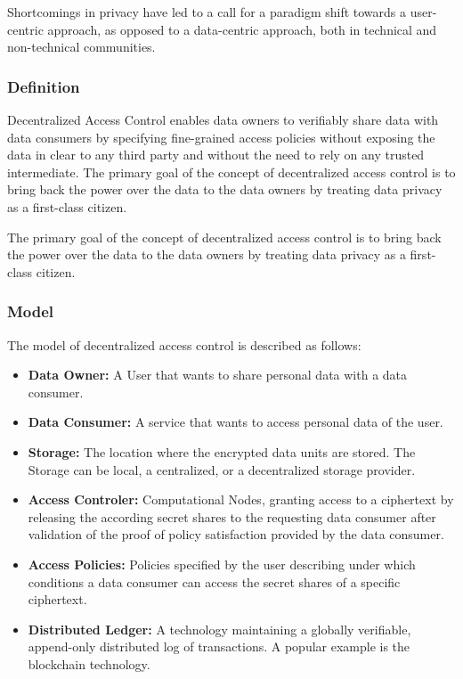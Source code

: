 \documentclass[conference]{IEEEtran}
\begin{document}
Shortcomings in privacy have led to a call for a paradigm shift towards a user-centric approach, as opposed to a data-centric approach, both in technical and non-technical communities. \cite{ernstberger_sok_2023, shafagh_droplet_2020}

\subsubsection{Definition}
Decentralized Access Control enables data owners to verifiably share data with data consumers by specifying fine-grained access policies without exposing the data in clear to any third party and without the need to rely on any trusted intermediate.
The primary goal of the concept of decentralized access control is to bring back the power over the data to the data owners by treating data privacy as a first-class citizen. \cite{ernstberger_sok_2023}

The primary goal of the concept of decentralized access control is to bring back the power over the data to the data owners by treating data privacy as a first-class citizen.

\subsubsection{Model}

The model of decentralized access control is described as follows:

\begin{itemize}
  \item \textbf{Data Owner:} A User that wants to share personal data with a data consumer.
  \item \textbf{Data Consumer:} A service that wants to access personal data of the user.
  \item \textbf{Storage:} The location where the encrypted data units are stored.
  The Storage can be local, a centralized, or a decentralized storage provider.
  \item \textbf{Access Controler:} Computational Nodes, granting access to a ciphertext by releasing the according secret shares to the requesting data consumer after validation of the proof of policy satisfaction provided by the data consumer.
  \item \textbf{Access Policies:} Policies specified by the user describing under which conditions a data consumer can access the secret shares of a specific ciphertext.
  \item \textbf{Distributed Ledger:} A technology maintaining a globally verifiable, append-only distributed log of transactions. A popular example is the blockchain technology. 
\end{itemize}
\end{document}
